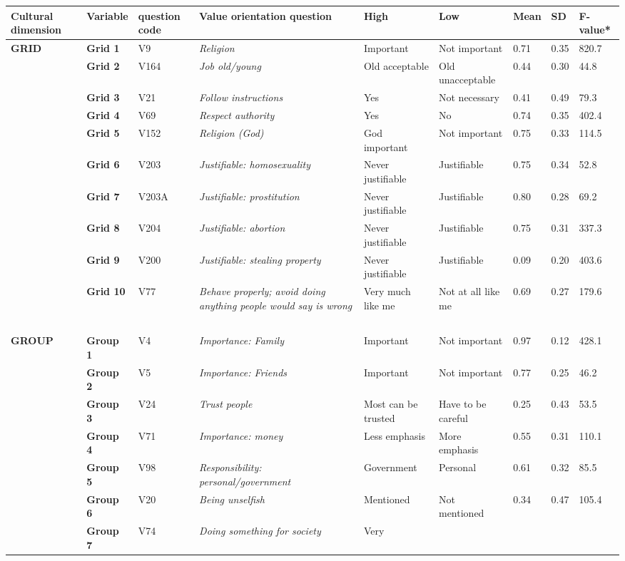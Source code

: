 

\begin{sidewaystable}[]
\begin{adjustbox}{width=\paperwidth}
\begin{tabular}[]{p{}lp{}p{}lllll}
\toprule
\textbf{Cultural dimension} &
\textbf{Variable} & 
\textbf{question code} & 
\textbf{Value orientation
question} & 
\textbf{High } & 
\textbf{Low} & 
\textbf{Mean} & 
\textbf{SD} & \textbf{F-value*}
\tabularnewline
\midrule
\textbf{GRID} & \textbf{Grid 1} & V9 & \emph{Religion} & Important & Not
important & 0.71 & 0.35 & 820.7\tabularnewline
& \textbf{Grid 2} & V164 & \emph{Job old/young} & Old acceptable & Old
unacceptable & 0.44 & 0.30 & 44.8\tabularnewline
& \textbf{Grid 3} & V21 & \emph{Follow instructions} & Yes & Not
necessary & 0.41 & 0.49 & 79.3\tabularnewline
& \textbf{Grid 4} & V69 & \emph{Respect authority} & Yes & No & 0.74 &
0.35 & 402.4\tabularnewline
& \textbf{Grid 5} & V152 & \emph{Religion (God)} & God important & Not
important & 0.75 & 0.33 & 114.5\tabularnewline
& \textbf{Grid 6} & V203 & \emph{Justifiable: homosexuality} & Never
justifiable & Justifiable & 0.75 & 0.34 & 52.8\tabularnewline
& \textbf{Grid 7} & V203A & \emph{Justifiable: prostitution} & Never
justifiable & Justifiable & 0.80 & 0.28 & 69.2\tabularnewline
& \textbf{Grid 8} & V204 & \emph{Justifiable: abortion} & Never
justifiable & Justifiable & 0.75 & 0.31 & 337.3\tabularnewline
& \textbf{Grid 9} & V200 & \emph{Justifiable: stealing property} & Never
justifiable & Justifiable & 0.09 & 0.20 & 403.6\tabularnewline
& \textbf{Grid 10} & V77 & \emph{Behave properly; avoid doing anything
people would say is wrong} & Very much like me & Not at all like me &
0.69 & 0.27 & 179.6\tabularnewline
& \textbf{~} & ~ & ~ & ~ & ~ & ~ & ~ & ~\tabularnewline
\textbf{GROUP} & \textbf{Group 1} & V4 & \emph{Importance: Family} &
Important & Not important & 0.97 & 0.12 & 428.1\tabularnewline
& \textbf{Group 2} & V5 & \emph{Importance: Friends} & Important & Not
important & 0.77 & 0.25 & 46.2\tabularnewline
& \textbf{Group 3} & V24 & \emph{Trust people} & Most can be trusted &
Have to be careful & 0.25 & 0.43 & 53.5\tabularnewline
& \textbf{Group 4} & V71 & \emph{Importance: money} & Less emphasis &
More emphasis & 0.55 & 0.31 & 110.1\tabularnewline
& \textbf{Group 5} & V98 & \emph{Responsibility: personal/government} &
Government & Personal & 0.61 & 0.32 & 85.5\tabularnewline
& \textbf{Group 6} & V20 & \emph{Being unselfish} & Mentioned & Not
mentioned & 0.34 & 0.47 & 105.4\tabularnewline
& \textbf{Group 7} & V74 & \emph{Doing something for society} & Very

\end{tabular}
\end{adjustbox}
\end{sidewaystable}
